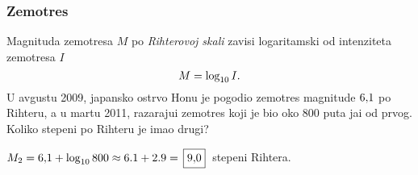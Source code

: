 \subsubsection{Zem{\lj}otres}

\zadatak Magnituda zem{\lj}otresa $M$ po {\sl Rihterovoj skali} zavisi logaritamski od 
inten\-zi\-te\-ta zem{\lj}otresa $I$ 
$$
M=\logten I.
$$
U avgustu 2009, japansko ostrvo Hon{\sv}u 
je pogodio zem{\lj}otres magnitude $6\.1$ po Rihteru, a u martu 2011,
razaraju{\cc}i zem{\lj}otres koji je bio oko 800 puta ja{\cv}i od prvog. Koliko stepeni po Rihteru je imao drugi?

\resenje $M_2 = 6\.1 + \logten 800\approx 6.1 + 2.9 = \ram{9\.0}$ stepeni Rihtera. 
